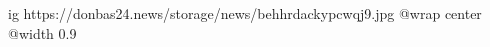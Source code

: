  
 
 
 
 

\ifcmt
  ig https://donbas24.news/storage/news/behhrdackypcwqj9.jpg
  @wrap center
  @width 0.9
\fi
